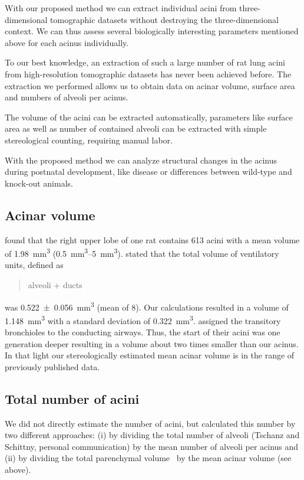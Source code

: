 \documentclass[paper=a4,twocolumn=true,DIV=calc,abstract,english]{scrartcl}
\newcommand{\meanacinarvolume}{1.148} %
\newcommand{\meanacinarvolumeSTD}{0.322} %
\begin{document}
With our proposed method we can extract individual acini from three-dimensional tomographic datasets without destroying the three-dimensional context.
We can thus assess several biologically interesting parameters mentioned above for each acinus individually.

To our best knowledge, an extraction of such a large number of rat lung acini from high-resolution tomographic datasets has never been achieved before.
The extraction we performed allows us to obtain data on acinar volume, surface area and numbers of alveoli per acinus.

The volume of the acini can be extracted automatically, parameters like surface area as well as number of contained alveoli can be extracted with simple stereological counting, requiring manual labor.

With the proposed method we can analyze structural changes in the acinus during postnatal development, like disease or differences between wild-type and knock-out animals.

\subsection{Acinar volume}
\citet{Rodriguez1987} found that the right upper lobe of one rat contains 613 acini with a mean volume of \SI{1.98}{\milli\meter\cubed} (\SIrange{0.5}{5}{\milli\meter\cubed}).
\citet{Mercer1987a} stated that the total volume of ventilatory units, defined as \blockquote{alveoli + ducts} was \SI{0.522(56)}{\milli\meter\cubed} (mean of 8). %
Our calculations resulted in a volume of \SI{\meanacinarvolume}{\milli\meter\cubed} with a standard deviation of \SI{\meanacinarvolumeSTD}{\milli\meter\cubed}.
\citeauthor{Mercer1987a} assigned the transitory bronchioles to the conducting airways.
Thus, the start of their acini was one generation deeper resulting in a volume about two times smaller than our acinus.
In that light our stereologically estimated mean acinar volume is in the range of previously published data.

\subsection{Total number of acini}
We did not directly estimate the number of acini, but calculated this number by two different approaches: (i) by dividing the total number of alveoli (Tschanz and Schittny, personal communication) by the mean number of alveoli per acinus and (ii) by dividing the total parenchymal volume~\citep{Tschanz2003} by the mean acinar volume (see above).
\end{document}
